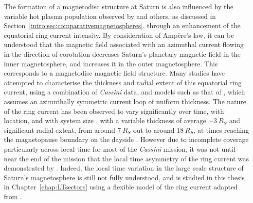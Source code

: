 The formation of a magnetodisc structure at Saturn is also influenced by the variable hot plasma population observed by \citet{sergis2010} and others, as discussed in Section~\ref{intro:sec:comparativemagnetospheres}, through an enhancement of the equatorial ring current intensity. By consideration of Amp\`ere's law, it can be understood that the magnetic field associated with an azimuthal current flowing in the direction of corotation decreases Saturn's planetary magnetic field in the inner magnetosphere, and increases it in the outer magnetosphere. This corresponds to a magnetodisc magnetic field structure. Many studies have attempted to characterise the thickness and radial extent of this equatorial ring current, using a combination of \textit{Cassini} data, and models such as that of \citet{connerney1981b, connerney1983}, which assumes an azimuthally symmetric current loop of uniform thickness. The nature of the ring current has been observed to vary significantly over time, with location, and with system size \citep[e.g.][]{bunce2007}, with a variable thickness of average ${\sim}\SI{3}{R_S}$ and significant radial extent, from around $\SI{7}{R_S}$ out to around $\SI{18}{R_S}$, at times reaching the magnetopause boundary on the dayside \citep[e.g.][]{kellett2009,sergis2009}. However due to incomplete coverage particularly across local time for most of the \textit{Cassini} mission, it was not until near the end of the mission that the local time asymmetry of the ring current was demonstrated by \citet{sergis2017}. Indeed, the local time variation in the large scale structure of Saturn's magnetosphere is still not fully understood, and is studied in this thesis in Chapter~\ref{chap:LTsectors} using a flexible model of the ring current adapted from \citet{achilleos2010a}.

